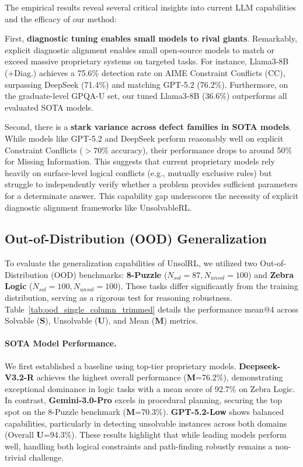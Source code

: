 The empirical results reveal several critical insights into current LLM capabilities and the efficacy of our method:

First, \textbf{diagnostic tuning enables small models to rival giants}. Remarkably, explicit diagnostic alignment enables small open-source models to match or exceed massive proprietary systems on targeted tasks. For instance, Llama3-8B (+Diag.) achieves a 75.6\% detection rate on AIME Constraint Conflicts (CC), surpassing DeepSeek (71.4\%) and matching GPT-5.2 (76.2\%). Furthermore, on the graduate-level GPQA-U set, our tuned Llama3-8B (36.6\%) outperforms all evaluated SOTA models.

Second, there is a \textbf{stark variance across defect families in SOTA models}. While models like GPT-5.2 and DeepSeek perform reasonably well on explicit Constraint Conflicts ($>70\%$ accuracy), their performance drops to around 50\% for Missing Information. This suggests that current proprietary models rely heavily on surface-level logical conflicts (e.g., mutually exclusive rules) but struggle to independently verify whether a problem provides sufficient parameters for a determinate answer. This capability gap underscores the necessity of explicit diagnostic alignment frameworks like UnsolvableRL.

\subsection{Out-of-Distribution (OOD) Generalization}
\label{sec:appendix_ood}

To evaluate the generalization capabilities of UnsolRL, we utilized two Out-of-Distribution (OOD) benchmarks: \textbf{8-Puzzle} ($N_{sol}=87, N_{unsol}=100$) and \textbf{Zebra Logic} ($N_{sol}=100, N_{unsol}=100$). These tasks differ significantly from the training distribution, serving as a rigorous test for reasoning robustness. Table~\ref{tab:ood_single_column_trimmed} details the performance mean@4 across Solvable (\textbf{S}), Unsolvable (\textbf{U}), and Mean (\textbf{M}) metrics. 

\paragraph{SOTA Model Performance.}
We first established a baseline using top-tier proprietary models. \textbf{Deepseek-V3.2-R} achieves the highest overall performance (\textbf{M}=76.2\%), demonstrating exceptional dominance in logic tasks with a mean score of 92.7\% on Zebra Logic. In contrast, \textbf{Gemini-3.0-Pro} excels in procedural planning, securing the top spot on the 8-Puzzle benchmark (\textbf{M}=70.3\%). \textbf{GPT-5.2-Low} shows balanced capabilities, particularly in detecting unsolvable instances across both domains (Overall \textbf{U}=94.3\%). These results highlight that while leading models perform well, handling both logical constraints and path-finding robustly remains a non-trivial challenge.

